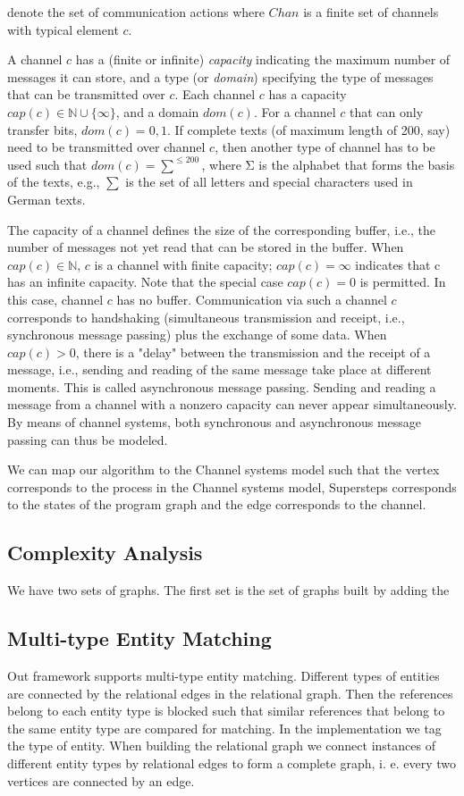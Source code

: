 denote the set of communication actions where $Chan$ is a finite set of channels with typical element $c$.

A channel $c$ has a (finite or infinite) \textit{capacity} indicating the maximum number of messages it can store, and a type (or \textit{domain}) specifying the type of messages that can be transmitted over $c$. Each channel $c$ has a capacity $cap(c) \in \mathbb{N} \cup \lbrace \infty \rbrace$, and a domain $dom(c)$. For a channel $c$ that can only transfer bits, $dom(c) = {0,1}$. If complete texts (of maximum length of 200, say) need to be transmitted over channel $c$, then another type of channel has to be used such that $dom(c) = \sum^{\leq200}$, where Σ is the alphabet that forms the basis of the texts, e.g., $\sum$ is the set of all letters and special characters used in German texts.

The capacity of a channel defines the size of the corresponding buffer, i.e., the number of
messages not yet read that can be stored in the buffer. When $cap(c) \in \mathbb{N}$, $c$ is a channel with finite capacity; $cap(c) = \infty$ indicates that c has an infinite capacity. Note that the special case $cap(c) = 0$ is permitted. In this case, channel $c$ has no buffer. Communication via such a channel $c$ corresponds to handshaking (simultaneous transmission and receipt, i.e., synchronous message passing) plus the exchange of some data. When $cap(c) > 0$,
there is a "delay" between the transmission and the receipt of a message, i.e., sending and
reading of the same message take place at different moments. This is called asynchronous
message passing. Sending and reading a message from a channel with a nonzero capacity
can never appear simultaneously. By means of channel systems, both synchronous and
asynchronous message passing can thus be modeled.

We can map our algorithm to the Channel systems model such that the vertex corresponds to the process in the Channel systems model, Supersteps corresponds to the states of the program graph and the edge corresponds to the channel.

\subsection{Complexity Analysis}
We have two sets of graphs. The first set is the set of graphs built by adding the  
\subsection{Multi-type Entity Matching}
Out framework supports multi-type entity matching. Different types of entities are connected by the relational edges in the relational graph. Then the references belong to each entity type is blocked such that similar references that belong to the same entity type are compared for matching. In the implementation we tag the type of entity.
When building the relational graph we connect instances of different entity types by relational edges to form a complete graph, i. e. every two vertices are connected by an edge.

